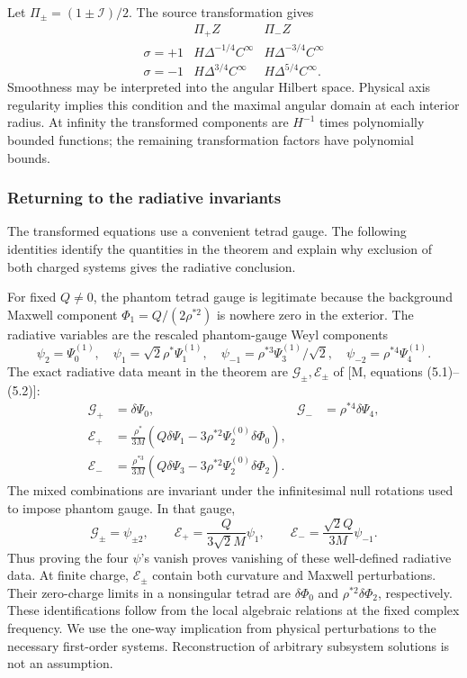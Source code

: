 \documentclass[11pt,a4paper]{article}
\begin{document}
Let \(\Pi_\pm=(1\pm\mathcal I)/2\). The source transformation gives \[
\begin{array}{c|cc}
 &\Pi_+Z&\Pi_-Z\\ \hline
 \sigma=+1&H\Delta^{-1/4}C^\infty&H\Delta^{-3/4}C^\infty\\
 \sigma=-1&H\Delta^{3/4}C^\infty&H\Delta^{5/4}C^\infty .
\end{array}
 \tag{7}
\] Smoothness may be interpreted into the angular Hilbert space.
Physical axis regularity implies this condition and the maximal angular
domain at each interior radius. At infinity the transformed components
are \(H^{-1}\) times polynomially bounded functions; the remaining
transformation factors have polynomial bounds.

\subsubsection{Returning to the radiative invariants}\label{readable-invariants}

The transformed equations use a convenient tetrad gauge. The following identities identify the quantities in the theorem and explain why exclusion of both charged systems gives the radiative conclusion.

For fixed \(Q\ne0\), the phantom tetrad gauge is legitimate because the
background Maxwell component \(\Phi_1=Q/(2\rho^{*2})\) is nowhere zero
in the exterior. The radiative variables are the rescaled phantom-gauge
Weyl components \[
 \psi_2=\Psi_0^{(1)},\quad
 \psi_1=\sqrt2\rho^*\Psi_1^{(1)},\quad
 \psi_{-1}=\rho^{*3}\Psi_3^{(1)}/\sqrt2,\quad
 \psi_{-2}=\rho^{*4}\Psi_4^{(1)}.
 \tag{8}
\] The exact radiative data meant in the theorem are
\(\mathcal G_\pm,\mathcal E_\pm\) of {[}M, equations (5.1)--(5.2){]}: \[
\begin{aligned}
 \mathcal G_+&=\delta\Psi_0,&
 \mathcal G_-&=\rho^{*4}\delta\Psi_4,\\
 \mathcal E_+&=\frac{\rho^*}{3M}
     (Q\delta\Psi_1-3\rho^{*2}\Psi_2^{(0)}\delta\Phi_0),\\
 \mathcal E_-&=\frac{\rho^{*3}}{3M}
     (Q\delta\Psi_3-3\rho^{*2}\Psi_2^{(0)}\delta\Phi_2).
\end{aligned}
 \tag{8a}
\] The mixed combinations are invariant under the infinitesimal null
rotations used to impose phantom gauge. In that gauge, \[
 \mathcal G_\pm=\psi_{\pm2},\qquad
 \mathcal E_+=\frac{Q}{3\sqrt2M}\psi_1,\qquad
 \mathcal E_-=\frac{\sqrt2Q}{3M}\psi_{-1}.
 \tag{8b}
\] Thus proving the four \(\psi\)'s vanish proves vanishing of these
well-defined radiative data. At finite charge, \(\mathcal E_\pm\)
contain both curvature and Maxwell perturbations. Their zero-charge
limits in a nonsingular tetrad are \(\delta\Phi_0\) and
\(\rho^{*2}\delta\Phi_2\), respectively. These identifications follow from the local algebraic relations at the fixed complex frequency. We use the
one-way implication from physical perturbations to the necessary
first-order systems. Reconstruction of arbitrary subsystem solutions is
not an assumption.
\end{document}
